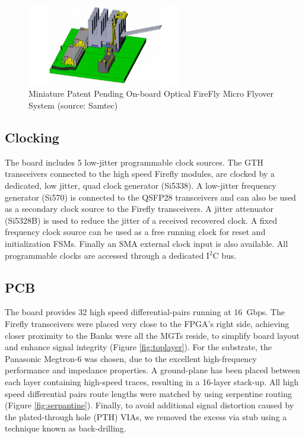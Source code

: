\documentclass[a4paper]{PoS}
\begin{document}
\begin{figure}
\centering
\includegraphics[width=0.6\textwidth]{firefly.png}
\caption{Miniature Patent Pending On-board Optical FireFly Micro
Flyover System (source: Samtec) }
\label{firefly}
\end{figure}


\subsection{Clocking}
The board includes 5 low-jitter programmable clock sources. The GTH transceivers connected to the high speed Firefly modules, are clocked by a dedicated, low jitter, quad clock generator (Si5338). A low-jitter frequency generator (Si570) is connected to the QSFP28 transceivers and can also be used as a secondary clock source to the Firefly transceivers. A jitter attenuator (Si5328B) is used to reduce the jitter of a received recovered clock. A fixed frequency clock source can be used as a free running clock for reset and initialization FSMs. Finally an SMA external clock input is also available. All programmable clocks are accessed through a dedicated I$^2$C bus.



\subsection{PCB}
The board provides 32 high speed differential-pairs running at 16~Gbps. The Firefly transceivers were placed very close to the FPGA's right side, achieving closer proximity to the Banks were all the MGTs reside, to simplify board layout and enhance signal integrity (Figure \ref{fig:toplayer}). For the substrate, the Panasonic Megtron-6 was chosen, due to the excellent high-frequency performance and impedance properties. A ground-plane has been placed between each layer containing high-speed traces, resulting in a 16-layer stack-up. All high speed differential pairs route lengths were matched by using serpentine routing (Figure \ref{fig:serpantine}). Finally, to avoid additional signal distortion caused by the plated-through hole (PTH) VIAs, we removed the excess via stub using a technique known as back-drilling.
\end{document}
